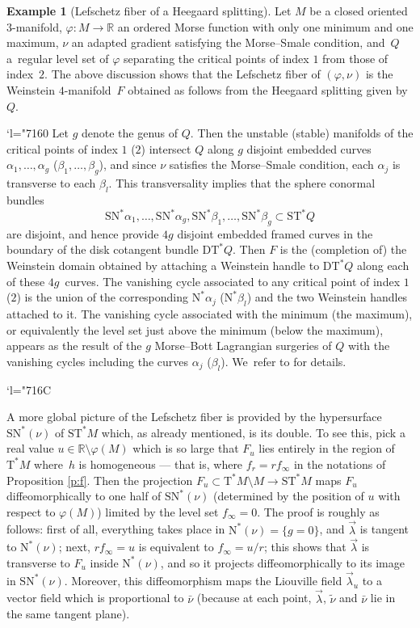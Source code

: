 \documentclass[10pt]{amsart}
\newcommand{\Changel}{\mathcode`l="7160}
\newcommand{\Changelback}{\mathcode`l="716C}
\newcommand{\R}{{\mathbb R}}
\newcommand{\etc}{,\ldots,}
\newcommand{\sN}{\mathrm{N}^\ast}
\newcommand{\sSN}{\mathrm{SN}^\ast}
\newcommand{\sT}{\mathrm{T}^\ast}
\newcommand{\sDT}{\mathrm{DT}^\ast}
\newcommand{\sST}{\mathrm{ST}^\ast}
\newcommand{\hnu}{\tilde\nu}
\newcommand{\cnu}{\bar\nu}
\let\on\colon
\theoremstyle{plain}
\theoremstyle{definition}
\newtheorem{example}{Example}
\begin{document}
\begin{example}[Lefschetz fiber of a Heegaard splitting]
Let $M$ be a closed oriented $3$-manifold, $\varphi \on M \to \R$ an ordered
Morse function with only one minimum and one maximum, $\nu$ an adapted gradient
satisfying the Morse--Smale condition, and~$Q$ a~regular level set of $\varphi$
separating the critical points of index $1$ from those of index~$2$. The above
discussion shows that the Lefschetz fiber of $(\varphi,\nu)$ is the Weinstein
$4$-manifold~$F$ obtained as follows from the Heegaard splitting given by~$Q$.

\Changel
Let $g$ denote the genus of $Q$. Then the unstable (\resp stable) manifolds of
the critical points of index $1$ (\resp $2$) intersect $Q$ along $g$ disjoint
embedded curves $\alpha_1 \etc \alpha_g$ (\resp $\beta_1 \etc \beta_g$), and
since $\nu$ satisfies the Morse--Smale condition, each $\alpha_j$ is transverse
to each $\beta_l$. This transversality implies that the sphere conormal bundles\vspace*{-3pt}\enlargethispage{.5\baselineskip}
\[
\sSN\alpha_1 \etc \sSN\alpha_g, \sSN\beta_1 \etc \sSN\beta_g
 \subset \sST Q
\]
are disjoint, and hence provide $4g$ disjoint embedded framed curves in the
boundary of the disk cotangent bundle $\sDT Q$. Then $F$ is the (completion of)
the Weinstein domain obtained by attaching a Weinstein handle to $\sDT Q$ along
each of these $4g$~curves. The vanishing cycle associated to any critical point
of index $1$ (\resp $2$) is the union of the corresponding $\sN\alpha_j$ (\resp $\sN\beta_l$) and the two Weinstein handles attached to it. The vanishing cycle
associated with the minimum (\resp the maximum), or equivalently the level set
just above the minimum (\resp below the maximum), appears as the result of the
$g$ Morse--Bott Lagrangian surgeries of $Q$ with the vanishing cycles including
the curves $\alpha_j$ (\resp $\beta_l$). We~refer to \cite{Sr} for details.
\end{example}
\Changelback

A more global picture of the Lefschetz fiber is provided by the hypersurface
$\sSN(\nu)$ of $\sST M$ which, as already mentioned, is its double. To see this,
pick a real value $u \in \R\setminus \varphi(M)$ which is so large that $F_u$ lies
entirely in the region of $\sT M$ where~$h$ is homogeneous --- that is, where
$f_r = rf_\infty$ in the notations of Proposition \ref{p:f}. Then the projection
$F_u \subset \sT M \setminus M \to \sST M$ maps $F_u$ diffeomorphically to one half of
$\sSN(\nu)$ (determined by the position of $u$ with respect to $\varphi(M)$)
limited by the level set $f_\infty = 0$. The proof is roughly as follows: first
of all, everything takes place in $\sN(\nu) = \{g=0\}$, and $\vec\lambda$ is
tangent to $\sN(\nu)$; next, $rf_\infty = u$ is equivalent to $f_\infty = u/r$;
this shows that $\vec\lambda$ is transverse to $F_u$ inside $\sN(\nu)$, and so
it projects diffeomorphically to its image in $\sSN(\nu)$. Moreover, this
diffeomorphism maps the Liouville field $\vec\lambda_u$ to a vector field which
is proportional to $\cnu$ (because at each point, $\vec\lambda$, $\hnu$ and
$\cnu$ lie in the same tangent plane).
\end{document}
